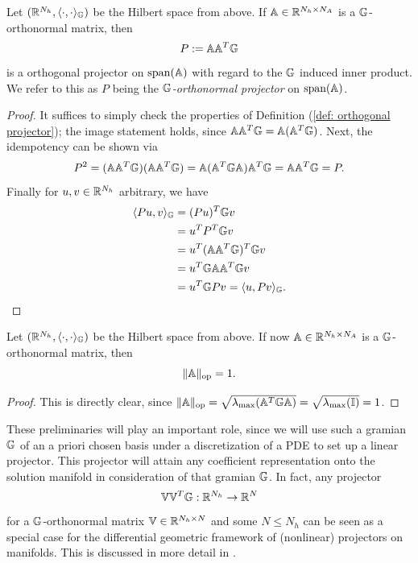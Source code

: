 \begin{lemma} \label{lemma: orthogonal projector on span of A}
    Let $(\mathbb{R}^{N_h}, \langle \cdot, \cdot \rangle_{\mathbb{G}})$ be the Hilbert space from above. If
    $\mathbb{A} \in \mathbb{R}^{N_h \times N_A}$ is a $\mathbb{G}$-orthonormal matrix, then
    \begin{equation*}
        P := \mathbb{A} \mathbb{A}^T \mathbb{G}
    \end{equation*}
    is a orthogonal projector on $\text{span}(\mathbb{A})$ with regard to the $\mathbb{G}$ induced inner product.
    We refer to this as $P$ being the \emph{$\mathbb{G}$-orthonormal projector} on $\text{span}(\mathbb{A})$.
\end{lemma}
\begin{proof}
    It suffices to simply check the properties of Definition (\ref{def: orthogonal projector}); the image
    statement holds, since $\mathbb{A} \mathbb{A}^T \mathbb{G} = \mathbb{A} (\mathbb{A}^T \mathbb{G})$. Next, the idempotency can be
    shown via
    \begin{equation*}
        P^2 = (\mathbb{A} \mathbb{A}^T \mathbb{G})(\mathbb{A} \mathbb{A}^T \mathbb{G}) = \mathbb{A} (\mathbb{A}^T \mathbb{G} \mathbb{A}) \mathbb{A}^T \mathbb{G} = \mathbb{A} \mathbb{A}^T \mathbb{G} = P.
    \end{equation*}
    Finally for $u, v \in \mathbb{R}^{N_h}$ arbitrary, we have 
    \begin{align*}
        \langle P u, v \rangle_{\mathbb{G}} &= (P u)^T \mathbb{G} v \\
        &= u^T P^T \mathbb{G} v \\
        &= u^T (\mathbb{A} \mathbb{A}^T \mathbb{G})^T \mathbb{G} v \\
        &= u^T \mathbb{G} \mathbb{A} \mathbb{A}^T \mathbb{G} v \\
        &= u^T \mathbb{G} P v = \langle u, Pv \rangle_{\mathbb{G}}.
    \end{align*}
\end{proof}

\begin{lemma} \label{lemma: opnorm A}
    Let $(\mathbb{R}^{N_h}, \langle \cdot, \cdot \rangle_{\mathbb{G}})$ be the Hilbert space from above.
    If now
    $\mathbb{A} \in \mathbb{R}^{N_h \times N_A}$ is a $\mathbb{G}$-orthonormal matrix, then
    \begin{equation*}
        \lVert \mathbb{A} \rVert_\text{op} = 1.
    \end{equation*}
\end{lemma}
\begin{proof}
    This is directly clear, since $\lVert \mathbb{A} \rVert_\text{op} = \sqrt{\lambda_\text{max}(\mathbb{A}^T \mathbb{G} \mathbb{A})} =
    \sqrt{\lambda_\text{max}(\mathbb{I})} = 1$.
\end{proof}


These preliminaries will play an important role, since we will use such a 
gramian $\mathbb{G}$ of an a priori chosen basis under a discretization of a PDE to set up a linear projector.
This projector will
attain any coefficient representation onto the solution manifold in consideration of that gramian $\mathbb{G}$.
In fact, any projector 
\begin{equation*}
    \mathbb{V} \mathbb{V}^T \mathbb{G} : \mathbb{R}^{N_h} \to \mathbb{R}^N
\end{equation*}
for a $\mathbb{G}$-orthonormal matrix $\mathbb{V} \in \mathbb{R}^{N_h \times N}$ and some $N \leq N_h$ can be seen as a special
case for the differential geometric framework 
of (nonlinear) projectors on manifolds. This is discussed in more detail in \cite{buchfink2023}.





